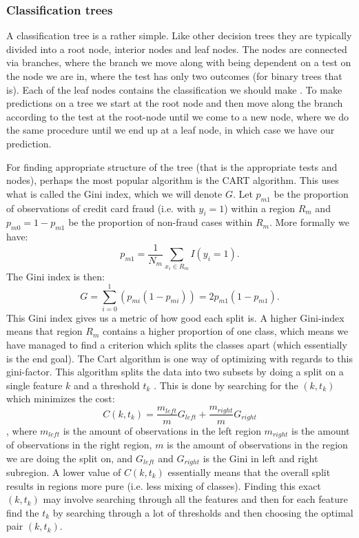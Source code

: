 \documentclass{article}
\begin{document}
\subsubsection{Classification trees}
A classification tree is a rather simple. Like other decision trees they are
typically divided into a root node, interior nodes and leaf nodes. The nodes
are connected via branches, where the branch we move along with being dependent
on a test on the node we are in, where the test has only two outcomes (for
binary trees that is). Each of the leaf nodes contains the classification we
should make \cite{lecturesweek46}. To make predictions on a tree we start at the
root node and then move along the branch according to the test at the root-node
until we come to a new node, where we do the same procedure until we end up at a
leaf node, in which case we have our prediction.

For finding appropriate structure of the tree (that is the appropriate tests
and nodes), perhaps the most popular algorithm is the CART algorithm. This uses
what is called the Gini index, which we will denote $G$. Let $p_{m 1}$ be the
proportion of observations of credit card fraud (i.e. with $y_i = 1$) within a
region $R_m$ and $p_{m 0} = 1 - p_{m 1}$ be the proportion of non-fraud cases
within $R_m$. More formally we have:
$$p_{m 1} = \frac{1}{N_m} \sum_{x_i \in R_m} I(y_i = 1).$$
The Gini index is then:
$$G = \sum_{i=0}^{1} (p_{m i} (1 - p_{m i})) = 2 p_{m 1} (1 - p_{m 1}).$$
This Gini index gives us a metric of how good each split is. A higher
Gini-index means that region $R_m$ contains a higher proportion of one class,
which means we have managed to find a criterion which splits the classes apart
(which essentially is the end goal).  The Cart algorithm is one way of
optimizing with regards to this gini-factor. This algorithm splits the data into
two subsets by doing a split on a single feature $k$ and a threshold $t_k$
\cite[s.~The CART algorithm for Classification]{lecturesweek46}. This is done by
searching for the $(k, t_{k})$ which minimizes the cost:
$$C(k, t_k) = \frac{m_{left}}{m} G_{left} + \frac{m_{right}}{m} G_{right}$$
, where $m_{left}$ is the amount of observations in the left region $m_{right}$
is the amount of observations in the right region, $m$ is the amount of
observations in the region we are doing the split on, and $G_{left}$ and
$G_{right}$ is the Gini in left and right subregion. A lower value of $C(k,
	t_k)$ essentially means that the overall split results in regions more pure
(i.e. less mixing of classes).  Finding this exact $(k, t_k)$ may involve
searching through all the features and then for each feature find the $t_k$
by searching through a lot of thresholds and then choosing the optimal pair
$(k, t_k)$.
\end{document}
